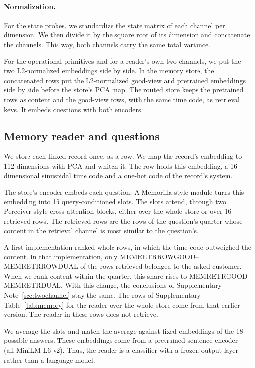 \documentclass[11pt]{article}
\begin{document}
\paragraph{Normalization.} For the state probes, we standardize the state matrix of each channel per dimension. We then divide it by the square root of its dimension and concatenate the channels. This way, both channels carry the same total variance.

For the operational primitives and for a reader's own two channels, we put the two L2-normalized embeddings side by side. In the memory store, the concatenated rows put the L2-normalized good-view and pretrained embeddings side by side before the store's PCA map. The routed store keeps the pretrained rows as content and the good-view rows, with the same time code, as retrieval keys. It embeds questions with both encoders.

\subsection{Memory reader and questions}
We store each linked record once, as a row. We map the record's embedding to 112 dimensions with PCA and whiten it. The row holds this embedding, a 16-dimensional sinusoidal time code and a one-hot code of the record's system.

The store's encoder embeds each question. A Memorilla-style module\citep{fallahpour2026memorilla} turns this embedding into 16 query-conditioned slots. The slots attend, through two Perceiver-style cross-attention blocks, either over the whole store or over 16 retrieved rows. The retrieved rows are the rows of the question's quarter whose content in the retrieval channel is most similar to the question's.

A first implementation ranked whole rows, in which the time code outweighed the content. In that implementation, only MEMRETRROWGOOD--MEMRETRROWDUAL of the rows retrieved belonged to the asked customer. When we rank content within the quarter, this share rises to MEMRETRGOOD--MEMRETRDUAL. With this change, the conclusions of Supplementary Note~\ref{sec:twochannel} stay the same. The rows of Supplementary Table~\ref{tab:memory} for the reader over the whole store come from that earlier version. The reader in these rows does not retrieve.

We average the slots and match the average against fixed embeddings of the 18 possible answers. These embeddings come from a pretrained sentence encoder (all-MiniLM-L6-v2). Thus, the reader is a classifier with a frozen output layer rather than a language model.
\end{document}
